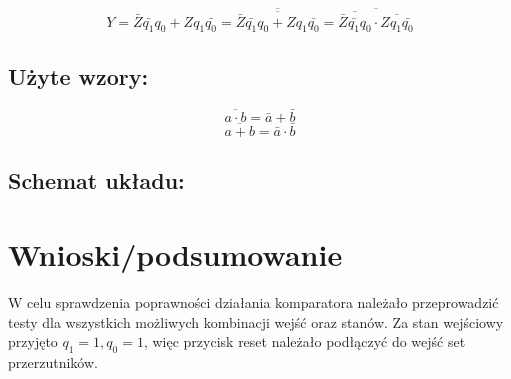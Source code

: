 \documentclass[12pt,a4paper]{article}
\begin{document}
		\vspace{.5cm}
		\begin{displaymath}
			Y = \bar{Z}\bar{q_1}q_0 + Zq_1\bar{q_0}	= \overline{\overline{\bar{Z}\bar{q_1}q_0 + Zq_1\bar{q_0}}}	=\overline{\overline{\bar{Z}\bar{q_1}q_0} \cdot \overline{Zq_1\bar{q_0}}}
		\end{displaymath}
	
		\newpage
		\subsection{Użyte wzory:}
			\begin{equation}
			\overline{a\cdot b}=\bar{a}+\bar{b}
			\end{equation}
			\begin{equation}
			\overline{a+b}=\bar{a}\cdot\bar{b}
			\end{equation}
		
		\subsection{Schemat układu:}
		
		\vspace{1.5cm}

	\section{Wnioski/podsumowanie}
	
			W celu sprawdzenia poprawności działania komparatora należało przeprowadzić testy dla wszystkich możliwych kombinacji wejść oraz stanów. Za stan wejściowy przyjęto \(q_1=1, q_0 = 1\), więc przycisk reset należało podłączyć do wejść set przerzutników.
	
\end{document}
